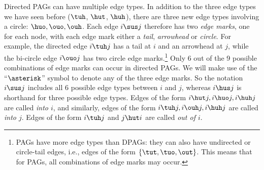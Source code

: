 Directed PAGs can have multiple edge types. In addition to the three edge types we have seen before
($\tuh$, $\hut$, $\huh$), there are three new edge types involving a circle: $\huo,\ouo,\ouh$.
Each edge $i \sus j$ therefore has two \emph{edge marks}, one for each node, with each edge mark
either a \emph{tail}, \emph{arrowhead} or \emph{circle}. For example, the directed edge $i \tuh j$ has a 
tail at $i$ and an arrowhead at $j$, while the bi-circle edge $i \ouo j$ has two circle edge marks.\footnote{PAGs have more edge types than DPAGs: they can also have 
undirected or circle-tail edges, i.e., edges of the form $\{\tut,\tuo,\out\}$. This means that for PAGs,
all combinations of edge marks may occur.}
Only 6 out of the 9 possible combinations of edge marks can occur in directed PAGs. We will make use
of the ``$\asterisk$'' symbol to denote any of the three edge marks. So the notation $i \sus j$
includes all 6 possible edge types between $i$ and $j$, whereas $i \hus j$ is shorthand for three
possible edge types.
Edges of the form $i \hut j, i \huo j, i \huh j$ are called \emph{into $i$}, and similarly, edges of the form $i \tuh j, i \ouh j, i \huh j$ are called \emph{into $j$}. Edges of the form $i \tuh j$ and $j \hut i$ are called \emph{out of $i$}.

